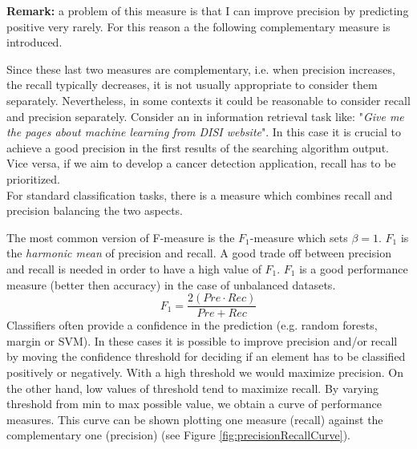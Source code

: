 \textbf{Remark:} a problem of this measure is that I can improve precision by
predicting positive very rarely. For this reason a the following complementary measure
is introduced.

Since these last two measures are complementary, i.e. when precision increases, the
recall typically decreases, it is not usually appropriate to consider them
separately. Nevertheless, in some contexts it could be reasonable to consider
recall and precision separately. Consider an in information retrieval task like:
"\textit{Give me the pages about machine learning from DISI website}". In this
case it is crucial to achieve a good precision in the first results of the
searching algorithm output. Vice versa, if we aim to develop a cancer detection
application, recall has to be prioritized.\\ For standard classification tasks,
there is a measure which combines recall and precision balancing the two aspects.


The most common version of F-measure is the $F_{1}$-measure which sets $\beta=1$.
$F_{1}$ is the \textit{harmonic mean} of precision and recall. A good trade off between
precision and recall is needed in order to have a high value of $F_{1}$. $F_{1}$
is a good performance measure (better then accuracy) in the case of unbalanced
datasets.
\begin{equation}
	F_{1}= \frac{2(\mathit{Pre} \cdot \mathit{Rec})}{\mathit{Pre} + \mathit{Rec}}
\end{equation}
Classifiers often provide a confidence in the prediction (e.g. random forests,
margin or SVM). In these cases it is possible to improve precision and/or recall
by moving the confidence threshold for deciding if an element has to be
classified positively or negatively. With a high threshold we would maximize precision.
On the other hand, low values of threshold tend to maximize recall. By varying
threshold from min to max possible value, we obtain a curve of performance measures.
This curve can be shown plotting one measure (recall) against the complementary
one (precision) (see Figure \ref{fig:precisionRecallCurve}).

